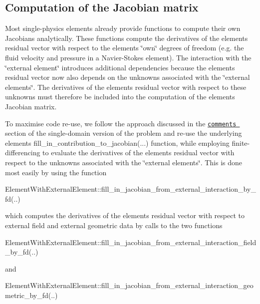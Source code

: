 \hypertarget{index_off_diag_jac}{}\subsection{Computation of the Jacobian matrix}\label{index_off_diag_jac}
Most single-\/physics elements already provide functions to compute their own Jacobians analytically. These functions compute the derivatives of the element\textquotesingle{}s residual vector with respect to the element\textquotesingle{}s \char`\"{}own\char`\"{} degrees of freedom (e.\+g. the fluid velocity and pressure in a Navier-\/\+Stokes element). The interaction with the \char`\"{}external element\char`\"{} introduces additional dependencies because the element\textquotesingle{}s residual vector now also depends on the unknowns associated with the \char`\"{}external
elements\char`\"{}. The derivatives of the element\textquotesingle{}s residual vector with respect to these unknowns must therefore be included into the computation of the element\textquotesingle{}s Jacobian matrix.

To maximise code re-\/use, we follow the approach discussed in the \href{../../b_convection/html/index.html#comments}{\tt comments } section of the single-\/domain version of the problem and re-\/use the underlying element\textquotesingle{}s {\ttfamily fill\+\_\+in\+\_\+contribution\+\_\+to\+\_\+jacobian}(...) function, while employing finite-\/differencing to evaluate the derivatives of the element\textquotesingle{}s residual vector with respect to the unknowns associated with the \char`\"{}external elements\char`\"{}. This is done most easily by using the function


\begin{DoxyCode}
ElementWithExternalElement::fill\_in\_jacobian\_from\_external\_interaction\_by\_fd(..)
\end{DoxyCode}


which computes the derivatives of the element\textquotesingle{}s residual vector with respect to external field and external geometric data by calls to the two functions


\begin{DoxyCode}
ElementWithExternalElement::fill\_in\_jacobian\_from\_external\_interaction\_field\_by\_fd(..)
\end{DoxyCode}


and


\begin{DoxyCode}
ElementWithExternalElement::fill\_in\_jacobian\_from\_external\_interaction\_geometric\_by\_fd(..)
\end{DoxyCode}


